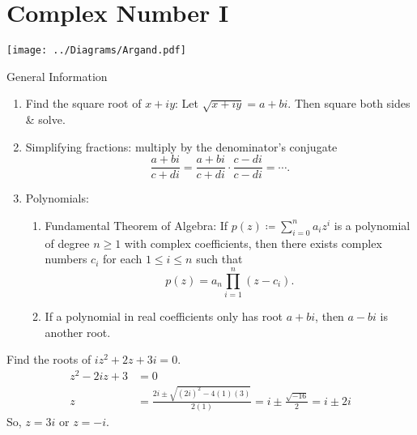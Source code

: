 \documentclass[oneside]{book}
\begin{document}
  \section{Complex Number I}
  \begin{center}
    \texttt{[image: ../Diagrams/Argand.pdf]}
  \end{center}
  \begin{stbox}{General Information}
    \begin{enumerate}
      \item Find the square root of \(x+iy\): Let \(\sqrt{x+iy}=a+bi\). Then square both sides \& solve.
      \item Simplifying fractions: multiply by the denominator's conjugate
      \[\frac{a+bi}{c+di}=\frac{a+bi}{c+di}\cdot\frac{c-di}{c-di}=\cdots.\]
      \item Polynomials:
      \begin{enumerate}
        \item Fundamental Theorem of Algebra: If \(p(z)\coloneq \sum_{i=0}^{n}a_iz^i\) is a polynomial of degree \(n \geq 1\) with complex coefficients, then there exists complex numbers \(c_i\) for each \(1 \leq i \leq n\) such that 
        \[p(z)=a_n \prod_{i=1}^{n}(z-c_i).\]
        \item If a polynomial in real coefficients only has root \(a+bi\), then \(a-bi\) is another root.
      \end{enumerate}
    \end{enumerate}
    \end{stbox}
        \begin{example}{}{}
          Find the roots of \(iz^2+2z+3i=0\).
          \begin{align*}
            z^2-2iz+3&=0\\
            z&=\frac{2i \pm \sqrt{(2i)^2-4(1)(3)}}{2(1)}=i \pm \frac{\sqrt{-16}}{2}=i \pm 2i
          \end{align*}
          So, \(z=3i\) or \(z=-i\).
        \end{example}
\end{document}
